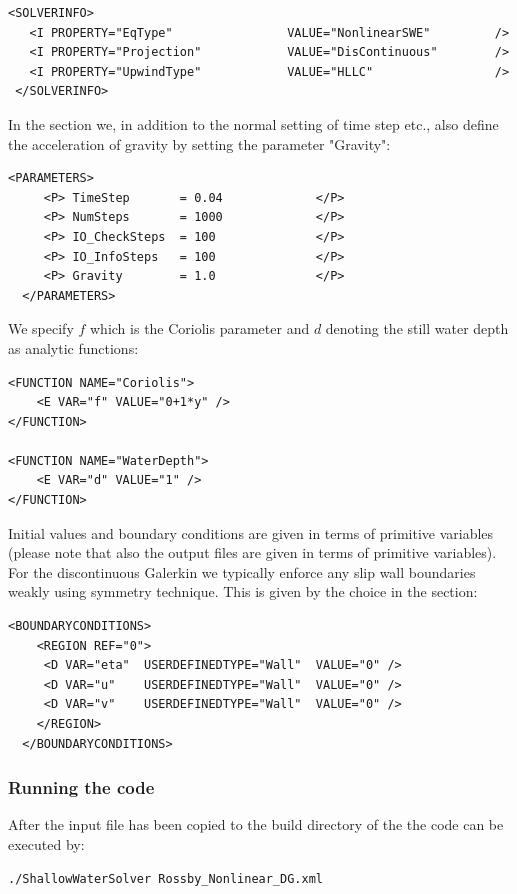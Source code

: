 \begin{lstlisting}[style=XmlStyle]
 <SOLVERINFO>
   <I PROPERTY="EqType"                VALUE="NonlinearSWE"         />
   <I PROPERTY="Projection"            VALUE="DisContinuous"        />
   <I PROPERTY="UpwindType"            VALUE="HLLC"                 />
 </SOLVERINFO>
\end{lstlisting}

In the  section we, in addition to the normal setting
of time step etc., also define the acceleration of gravity by 
setting the parameter "Gravity": 
\begin{lstlisting}[style=XmlStyle]
  <PARAMETERS>
     <P> TimeStep       = 0.04             </P>
     <P> NumSteps       = 1000             </P>
     <P> IO_CheckSteps  = 100              </P>
     <P> IO_InfoSteps   = 100              </P>
     <P> Gravity        = 1.0              </P>
  </PARAMETERS>
\end{lstlisting}

We specify $f$ which is the Coriolis parameter and $d$ denoting the
still water depth as analytic functions:
\begin{lstlisting}[style=XmlStyle]
<FUNCTION NAME="Coriolis">
    <E VAR="f" VALUE="0+1*y" />
</FUNCTION>

<FUNCTION NAME="WaterDepth">
    <E VAR="d" VALUE="1" />
</FUNCTION>
\end{lstlisting}

Initial values and boundary conditions are given in terms of primitive variables
(please note that also the output files are given in terms of primitive
variables). For the discontinuous Galerkin we typically enforce any slip wall boundaries
weakly using symmetry technique. This is given by the
 choice in the 
section:
\begin{lstlisting}[style=XmlStyle]
  <BOUNDARYCONDITIONS>
    <REGION REF="0">
     <D VAR="eta"  USERDEFINEDTYPE="Wall"  VALUE="0" />
     <D VAR="u"    USERDEFINEDTYPE="Wall"  VALUE="0" />
     <D VAR="v"    USERDEFINEDTYPE="Wall"  VALUE="0" />
    </REGION>
  </BOUNDARYCONDITIONS>
\end{lstlisting}

\subsubsection{Running the code}

After the input file has been copied to the build directory
of the  the code can be executed by:
\begin{lstlisting}[style=BashInputStyle]
 ./ShallowWaterSolver Rossby_Nonlinear_DG.xml
\end{lstlisting}

